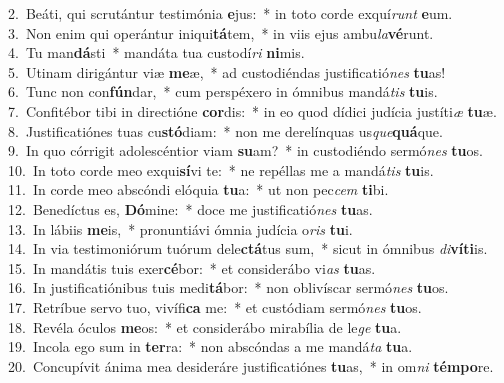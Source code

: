 {2.~}Beáti, qui scrutántur testimónia \textbf{e}jus:~* in toto corde exquí\textit{runt} \textbf{e}um.\\
{3.~}Non enim qui operántur iniqui\textbf{tá}tem,~* in viis ejus ambu\textit{la}\textbf{vé}runt.\\
{4.~}Tu man\textbf{dá}sti~* mandáta tua custodí\textit{ri} \textbf{ni}mis.\\
{5.~}Utinam dirigántur viæ \textbf{me}æ,~* ad custodiéndas justificatió\textit{nes} \textbf{tu}as!\\
{6.~}Tunc non con\textbf{fún}dar,~* cum perspéxero in ómnibus mandá\textit{tis} \textbf{tu}is.\\
{7.~}Confitébor tibi in directióne \textbf{cor}dis:~* in eo quod dídici judícia justíti\textit{æ} \textbf{tu}æ.\\
{8.~}Justificatiónes tuas cu\textbf{stó}diam:~* non me derelínquas us\textit{que}\textbf{quá}que.\\
{9.~}In quo córrigit adolescéntior viam \textbf{su}am?~* in custodiéndo sermó\textit{nes} \textbf{tu}os.\\
{10.~}In toto corde meo exqui\textbf{sí}vi te:~* ne repéllas me a mandá\textit{tis} \textbf{tu}is.\\
{11.~}In corde meo abscóndi elóquia \textbf{tu}a:~* ut non pec\textit{cem} \textbf{ti}bi.\\
{12.~}Benedíctus es, \textbf{Dó}mine:~* doce me justificatió\textit{nes} \textbf{tu}as.\\
{13.~}In lábiis \textbf{me}is,~* pronuntiávi ómnia judícia o\textit{ris} \textbf{tu}i.\\
{14.~}In via testimoniórum tuórum dele\textbf{ctá}tus sum,~* sicut in ómnibus \textit{di}\textbf{ví}\textbf{ti}is.\\
{15.~}In mandátis tuis exer\textbf{cé}bor:~* et considerábo vi\textit{as} \textbf{tu}as.\\
{16.~}In justificatiónibus tuis medi\textbf{tá}bor:~* non oblivíscar sermó\textit{nes} \textbf{tu}os.\\
{17.~}Retríbue servo tuo, vivífi\textbf{ca} me:~* et custódiam sermó\textit{nes} \textbf{tu}os.\\
{18.~}Revéla óculos \textbf{me}os:~* et considerábo mirabília de le\textit{ge} \textbf{tu}a.\\
{19.~}Incola ego sum in \textbf{ter}ra:~* non abscóndas a me mandá\textit{ta} \textbf{tu}a.\\
{20.~}Concupívit ánima mea desideráre justificatiónes \textbf{tu}as,~* in om\textit{ni} \textbf{tém}\textbf{po}re.\\

